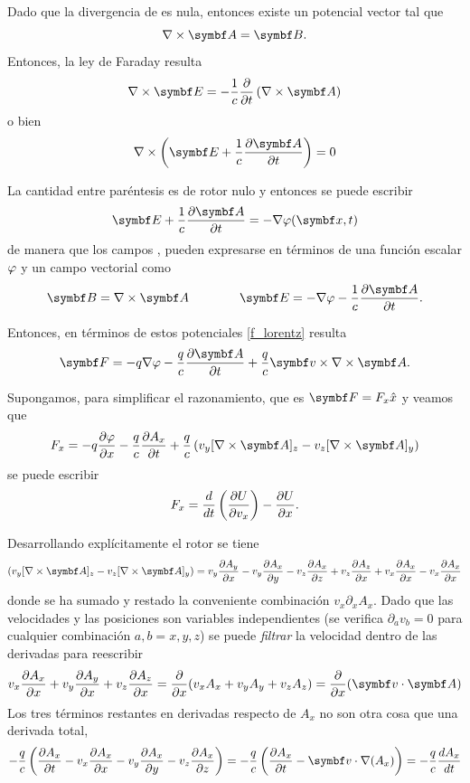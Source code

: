 \documentclass[10pt,oneside]{CBFT_book}
\begin{document}
Dado que la divergencia de  es nula, entonces existe un potencial vector  tal que 
\[
	\rotorm{A} = \vb{B}.
\]
Entonces, la ley de Faraday resulta 
\[
	\rotorm{E} = -\frac{1}{c} \dpar{}{t} \left(\rotorm{A} \right) 
\]
o bien 
\[
	\nabla\times\left( \vb{E} + \frac{1}{c}\dpar{\vb{A}}{t} \right) = 0
\]

La cantidad entre paréntesis es de rotor nulo y entonces se puede escribir
\[
	\vb{E} + \frac{1}{c}\dpar{\vb{A}}{t} = -\nabla \vp( \vb{x}, t )
\]
de manera que los campos ,  pueden expresarse en términos de una función escalar $\varphi$ y un campo vectorial
 como
\[
	\vb{B} = \rotorm{A} \qquad \qquad \vb{E} = - \nabla \vp - \frac{1}{c} \dpar{ \vb{A} }{t} .
\]

Entonces, en términos de estos potenciales \eqref{f_lorentz} resulta 
\[
	\vb{F} = -q\nabla \vp - \frac{q}{c} \dpar{ \vb{A} }{t} + \frac{q}{c} \vb{v} \times \rotorm{A}.
\]

Supongamos, para simplificar el razonamiento, que es $ \vb{F} = F_x \hat{x} $ y veamos que 
\[
	F_x = -q \dpar{ \vp }{ x } - \frac{q}{c} \dpar{ A_x }{t} + \frac{q}{c} \left( v_y [\rotorm{A}]_z - v_z [\rotorm{A}]_y \right)
\]
se puede escribir
\[
	F_x = \frac{d^{\hspace{-0.05em}} {}}{d {t}^{\hspace{-0.05em}}} \left( \frac{\partial^{\hspace{-0.05em}} {U}}{\partial {v_x}^{\hspace{-0.05em}}} \right)  -\frac{\partial^{\hspace{-0.05em}} {U}}{\partial {x}^{\hspace{-0.05em}}}.
\]

Desarrollando explícitamente el rotor se tiene 
\[
	\left( v_y [\rotorm{A}]_z - v_z [\rotorm{A}]_y \right) = 
	v_y \dpar{A_y}{x} - v_y \dpar{A_x}{y} - v_z \dpar{A_x}{z} + v_z \dpar{A_z}{x} + v_x \dpar{A_x}{x} - v_x \dpar{A_x}{x}
\]
donde se ha sumado y restado la conveniente combinación $ v_x \partial_x A_x $. Dado que las velocidades y las posiciones son variables
independientes (se verifica $ \partial_a v_b = 0 $ para cualquier combinación $ a,b=x,y,z $) se puede {\it filtrar} la velocidad dentro
de las derivadas para reescribir 
\[
	v_x \dpar{A_x}{x} + v_y \dpar{A_y}{x} + v_z \dpar{A_z}{x} = \dpar{}{x}( v_xA_x + v_yA_y + v_zA_z ) = \dpar{}{x}( \pe{v}{A} )
\]
Los tres términos restantes en derivadas respecto de $A_x$ no son otra cosa que una derivada total,
\[
	- \frac{q}{c} \left(  \dpar{ A_x }{t}- v_x\dpar{ A_x}{x} - v_y\dpar{A_x}{y} - v_z\dpar{A_x}{z} \right) =
	- \frac{q}{c} \left( \dpar{ A_x }{t} - \vb{v}\cdot\nabla( A_x ) \right) = - \frac{q}{c} \dtot{A_x}{t}
\]
\end{document}
